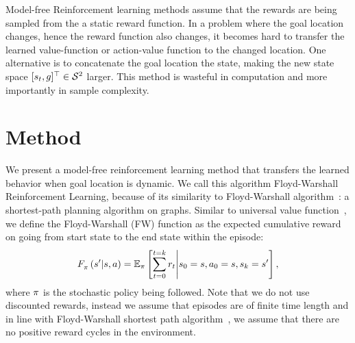 Model-free Reinforcement learning methods assume that the rewards are
being sampled from the a static reward function.  In a problem where the
goal location changes, hence the reward function also changes, it
becomes hard to transfer the learned value-function or action-value
function to the changed location.  One alternative is to concatenate the
goal location the state, making the new state space $[s_t,
g]^\top \in \mathcal{S}^2$ larger.  This method is wasteful in
computation and more importantly in sample complexity.

\section{Method}
\label{sec:method}
We present a model-free reinforcement learning method that transfers the
learned behavior when goal location is dynamic. We call this algorithm
Floyd-Warshall Reinforcement Learning, because of its similarity to
Floyd-Warshall algorithm~\cite{floydwarshall1962}:
a shortest-path planning algorithm on graphs. Similar
to universal value function~\cite{schaul2015universal}, we define the Floyd-Warshall
(FW) function as the expected cumulative reward on going from start state to the
end state within the episode:
%
\begin{align}
F_{\pi}^{}\left({s'}\middle|{s}, {a}\right) =
\mathbb{E}_{\pi}\left[ \sum_{t=0}^{t=k} r_t \middle\vert s_0 = s, a_0 = s, s_k = s' \right] ,
\end{align}%
%
where $\pi$ is the
stochastic policy being followed.
Note that we do not use discounted rewards, instead we assume that episodes are
of finite time length and in line with Floyd-Warshall shortest path
algorithm~\cite{floydwarshall1962}, we assume that there are no positive reward
cycles in the environment.

